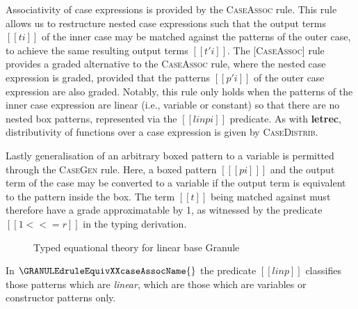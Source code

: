 Associativity of case expressions is provided by the \textsc{CaseAssoc} rule.
This rule allows us to restructure nested case expressions such that the output
terms $[[ ti ]]$ of the inner case may be matched against the patterns of the
outer case, to achieve the same resulting output terms $[[ t'i ]]$. The
\textsc{[CaseAssoc]} rule provides a graded alternative to the
\textsc{CaseAssoc} rule, where the nested case expression is graded, provided
that the patterns $[[ p'i ]]$ of the outer case expression are also graded.
Notably, this rule only holds when the patterns of the inner case expression are
linear (i.e., variable or constant) so that there are no nested box patterns,
represented via the $[[ lin pi ]]$ predicate. As with \textbf{letrec},
distributivity of functions over a case expression is given by
\textsc{CaseDistrib}.


Lastly generalisation of an arbitrary boxed pattern to a variable is permitted
through the \textsc{CaseGen} rule. Here, a boxed pattern $[[  [pi] ]]$ and the
output term of the case may be converted to a variable if the output term is
equivalent to the pattern inside the box. The term $[[t]]$ being matched against
must therefore have a grade approximatable by 1, as witnessed by the predicate
$[[ 1 <<= r ]]$ in the typing derivation.




  \begin{figure}
{}
\label{fig:typed-eqt}
\caption{Typed equational theory for linear base Granule}
\end{figure}
%
In $\GRANULEdruleEquivXXcaseAssocName{}$
the predicate $[[ lin p ]]$ classifies those
patterns which are \emph{linear}, which are those which
are variables or constructor patterns only.

